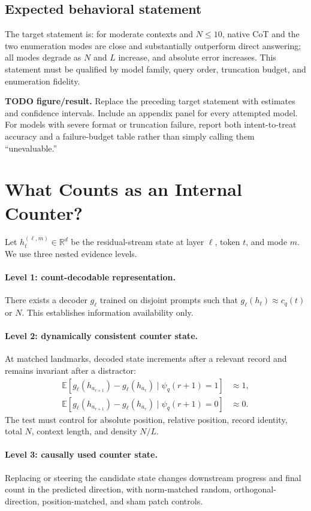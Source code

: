 \documentclass[10pt,twocolumn]{article}
\newcommand{\todoplot}[1]{%
  \par\noindent\textcolor{red!75!black}{\textbf{TODO figure/result.} #1}\par}
\newcommand{\R}{\mathbb{R}}
\newcommand{\E}{\mathbb{E}}
\begin{document}
\subsection{Expected behavioral statement}
The target statement is:
for moderate contexts and $N\le 10$, native CoT and the two enumeration modes are close and
substantially outperform direct answering; all modes degrade as $N$ and $L$ increase, and absolute
error increases. This statement must be qualified by model family, query order, truncation budget,
and enumeration fidelity.

\todoplot{Replace the preceding target statement with estimates and confidence intervals.
Include an appendix panel for every attempted model. For models with severe format or truncation
failure, report both intent-to-treat accuracy and a failure-budget table rather than simply calling
them ``unevaluable.''}

\section{What Counts as an Internal Counter?}
Let $h^{(\ell,m)}_t\in\R^d$ be the residual-stream state at layer $\ell$, token $t$, and mode $m$.
We use three nested evidence levels.

\paragraph{Level 1: count-decodable representation.}
There exists a decoder $g_\ell$ trained on disjoint prompts such that
$g_\ell(h_t)\approx c_q(t)$ or $N$. This establishes information availability only.

\paragraph{Level 2: dynamically consistent counter state.}
At matched landmarks, decoded state increments after a relevant record and remains invariant after
a distractor:
\[
\begin{aligned}
 \E[g_\ell(h_{a_{r+1}})-g_\ell(h_{a_r})\mid \psi_q(r+1)=1]&\approx 1,\\
 \E[g_\ell(h_{a_{r+1}})-g_\ell(h_{a_r})\mid \psi_q(r+1)=0]&\approx 0.
\end{aligned}
\]
The test must control for absolute position, relative position, record identity, total $N$,
context length, and density $N/L$.

\paragraph{Level 3: causally used counter state.}
Replacing or steering the candidate state changes downstream progress and final count in the
predicted direction, with norm-matched random, orthogonal-direction, position-matched, and sham
patch controls.
\end{document}

